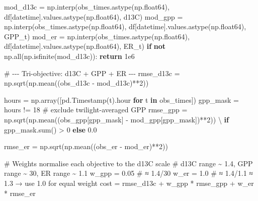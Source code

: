 \documentclass[
  letterpaper,
  DIV=11,
  numbers=noendperiod]{scrartcl}
\newenvironment{Shaded}{\begin{snugshade}}{\end{snugshade}}
\newcommand{\BuiltInTok}[1]{\textcolor[rgb]{0.00,0.23,0.31}{#1}}
\newcommand{\CommentTok}[1]{\textcolor[rgb]{0.37,0.37,0.37}{#1}}
\newcommand{\ControlFlowTok}[1]{\textcolor[rgb]{0.00,0.23,0.31}{\textbf{#1}}}
\newcommand{\DecValTok}[1]{\textcolor[rgb]{0.68,0.00,0.00}{#1}}
\newcommand{\FloatTok}[1]{\textcolor[rgb]{0.68,0.00,0.00}{#1}}
\newcommand{\KeywordTok}[1]{\textcolor[rgb]{0.00,0.23,0.31}{\textbf{#1}}}
\newcommand{\NormalTok}[1]{\textcolor[rgb]{0.00,0.23,0.31}{#1}}
\newcommand{\OperatorTok}[1]{\textcolor[rgb]{0.37,0.37,0.37}{#1}}
\newcommand{\StringTok}[1]{\textcolor[rgb]{0.13,0.47,0.30}{#1}}
\begin{document}
\begin{Shaded}
\begin{Highlighting}[]
\NormalTok{    mod\_d13c }\OperatorTok{=}\NormalTok{ np.interp(obs\_times.astype(np.float64),}
\NormalTok{                         df[}\StringTok{\textquotesingle{}datetime\textquotesingle{}}\NormalTok{].values.astype(np.float64), d13C)}
\NormalTok{    mod\_gpp  }\OperatorTok{=}\NormalTok{ np.interp(obs\_times.astype(np.float64),}
\NormalTok{                         df[}\StringTok{\textquotesingle{}datetime\textquotesingle{}}\NormalTok{].values.astype(np.float64), GPP\_t)}
\NormalTok{    mod\_er   }\OperatorTok{=}\NormalTok{ np.interp(obs\_times.astype(np.float64),}
\NormalTok{                         df[}\StringTok{\textquotesingle{}datetime\textquotesingle{}}\NormalTok{].values.astype(np.float64), ER\_t)}
    \ControlFlowTok{if} \KeywordTok{not}\NormalTok{ np.}\BuiltInTok{all}\NormalTok{(np.isfinite(mod\_d13c)):}
        \ControlFlowTok{return} \FloatTok{1e6}

    \CommentTok{\# {-}{-}{-} Tri{-}objective: d13C + GPP + ER {-}{-}{-}}
\NormalTok{    rmse\_d13c }\OperatorTok{=}\NormalTok{ np.sqrt(np.mean((obs\_d13c }\OperatorTok{{-}}\NormalTok{ mod\_d13c)}\OperatorTok{**}\DecValTok{2}\NormalTok{))}

\NormalTok{    hours    }\OperatorTok{=}\NormalTok{ np.array([pd.Timestamp(t).hour }\ControlFlowTok{for}\NormalTok{ t }\KeywordTok{in}\NormalTok{ obs\_times])}
\NormalTok{    gpp\_mask }\OperatorTok{=}\NormalTok{ hours }\OperatorTok{!=} \DecValTok{18}   \CommentTok{\# exclude twilight{-}averaged GPP}
\NormalTok{    rmse\_gpp }\OperatorTok{=}\NormalTok{ np.sqrt(np.mean((obs\_gpp[gpp\_mask] }\OperatorTok{{-}}\NormalTok{ mod\_gpp[gpp\_mask])}\OperatorTok{**}\DecValTok{2}\NormalTok{)) }\OperatorTok{\textbackslash{}}
               \ControlFlowTok{if}\NormalTok{ gpp\_mask.}\BuiltInTok{sum}\NormalTok{() }\OperatorTok{\textgreater{}} \DecValTok{0} \ControlFlowTok{else} \FloatTok{0.0}

\NormalTok{    rmse\_er  }\OperatorTok{=}\NormalTok{ np.sqrt(np.mean((obs\_er }\OperatorTok{{-}}\NormalTok{ mod\_er)}\OperatorTok{**}\DecValTok{2}\NormalTok{))}

    \CommentTok{\# Weights normalise each objective to the d13C scale}
    \CommentTok{\# d13C range \textasciitilde{} 1.4, GPP range \textasciitilde{} 30, ER range \textasciitilde{} 1.1}
\NormalTok{    w\_gpp }\OperatorTok{=} \FloatTok{0.05}    \CommentTok{\# ≈ 1.4/30}
\NormalTok{    w\_er  }\OperatorTok{=} \FloatTok{1.0}     \CommentTok{\# ≈ 1.4/1.1 ≈ 1.3 → use 1.0 for equal weight}
\NormalTok{    cost  }\OperatorTok{=}\NormalTok{ rmse\_d13c }\OperatorTok{+}\NormalTok{ w\_gpp }\OperatorTok{*}\NormalTok{ rmse\_gpp }\OperatorTok{+}\NormalTok{ w\_er }\OperatorTok{*}\NormalTok{ rmse\_er}


\end{Highlighting}
\end{Shaded}
\end{document}
